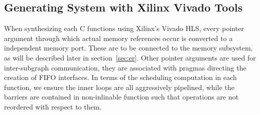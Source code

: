 \subsection{Generating System with Xilinx Vivado Tools}
When synthesizing each C functions using Xilinx's Vivado HLS, every pointer argument through which actual memory references occur is converted to a independent memory port. These
are to be connected to the memory subsystem, as will be described later in section~\ref{sec:er}. Other pointer arguments are used for inter-subgraph communication,
they are associated with pragmas directing the creation of FIFO interfaces. In terms of
the scheduling computation in each function, we ensure the inner loops are
all aggressively pipelined, while the barriers are contained in non-inlinable function such that operations are not reordered with respect to them.

